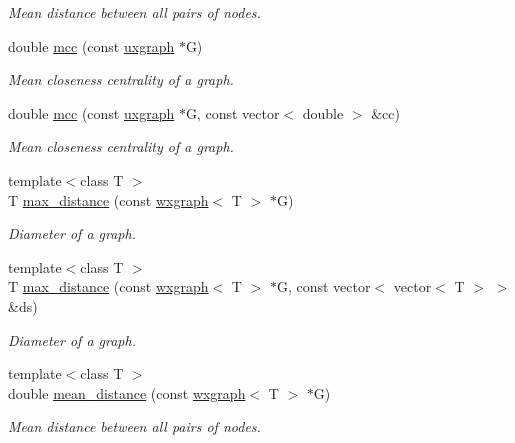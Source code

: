 \begin{DoxyCompactItemize}
\begin{DoxyCompactList}\small\item\em Mean distance between all pairs of nodes. \end{DoxyCompactList}\item 
double \hyperlink{namespacelgraph_1_1networks_1_1metrics_1_1distance_a29f1194ca5bd104ae062792a6df1c401}{mcc} (const \hyperlink{classlgraph_1_1utils_1_1uxgraph}{uxgraph} $\ast$G)
\begin{DoxyCompactList}\small\item\em Mean closeness centrality of a graph. \end{DoxyCompactList}\item 
double \hyperlink{namespacelgraph_1_1networks_1_1metrics_1_1distance_a9725dd02abeac8fedb2eb6c9f4612411}{mcc} (const \hyperlink{classlgraph_1_1utils_1_1uxgraph}{uxgraph} $\ast$G, const vector$<$ double $>$ \&cc)
\begin{DoxyCompactList}\small\item\em Mean closeness centrality of a graph. \end{DoxyCompactList}\item 
{\footnotesize template$<$class T $>$ }\\T \hyperlink{namespacelgraph_1_1networks_1_1metrics_1_1distance_ab497d212293a672c1b511f3e9224603d}{max\+\_\+distance} (const \hyperlink{classlgraph_1_1utils_1_1wxgraph}{wxgraph}$<$ T $>$ $\ast$G)
\begin{DoxyCompactList}\small\item\em Diameter of a graph. \end{DoxyCompactList}\item 
{\footnotesize template$<$class T $>$ }\\T \hyperlink{namespacelgraph_1_1networks_1_1metrics_1_1distance_a43fd9a1a41e0bb672865e1ca6f0b73f5}{max\+\_\+distance} (const \hyperlink{classlgraph_1_1utils_1_1wxgraph}{wxgraph}$<$ T $>$ $\ast$G, const vector$<$ vector$<$ T $>$ $>$ \&ds)
\begin{DoxyCompactList}\small\item\em Diameter of a graph. \end{DoxyCompactList}\item 
{\footnotesize template$<$class T $>$ }\\double \hyperlink{namespacelgraph_1_1networks_1_1metrics_1_1distance_a17eab7f8ea3692a6f531219ebd567a2f}{mean\+\_\+distance} (const \hyperlink{classlgraph_1_1utils_1_1wxgraph}{wxgraph}$<$ T $>$ $\ast$G)
\begin{DoxyCompactList}\small\item\em Mean distance between all pairs of nodes. \end{DoxyCompactList}\item 

\end{DoxyCompactItemize}
